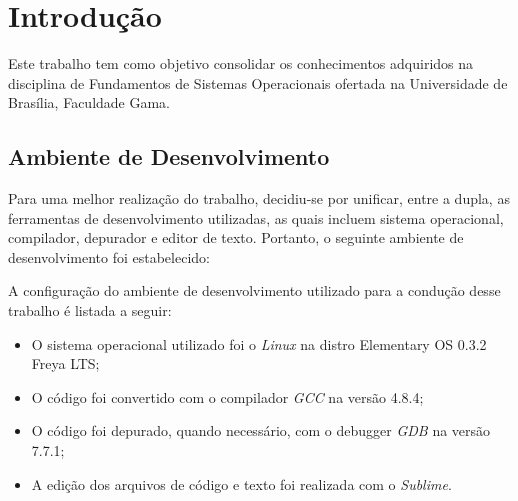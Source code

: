 \chapter[Introdução]{Introdução}

	Este trabalho tem como objetivo consolidar os conhecimentos adquiridos na disciplina de Fundamentos de Sistemas
	Operacionais ofertada na Universidade de Brasília, Faculdade Gama.

\section{Ambiente de Desenvolvimento}

	Para uma melhor realização do trabalho, decidiu-se por unificar, entre a dupla, as ferramentas de desenvolvimento
	utilizadas, as quais incluem sistema operacional, compilador, depurador e editor de texto. Portanto, o seguinte
	ambiente de desenvolvimento foi estabelecido:

  A configuração do ambiente de desenvolvimento utilizado para a condução desse trabalho é listada a seguir:

	\begin{itemize}

		\item O sistema operacional utilizado foi o \textit{Linux} na distro Elementary OS 0.3.2 Freya LTS;
		\item O código foi convertido com o compilador \textit{GCC} na versão 4.8.4;
		\item O código foi depurado, quando necessário, com o debugger \textit{GDB} na versão 7.7.1;
		\item A edição dos arquivos de código e texto foi realizada com o \textit{Sublime}.

	\end{itemize}
